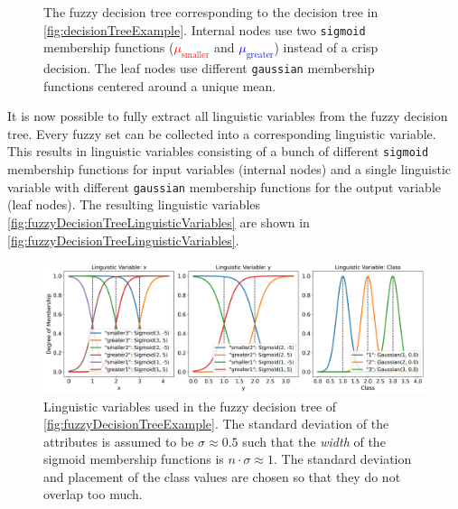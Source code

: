 \begin{figure}[H]

    \caption[Fuzzy decision tree created from the regular decision tree]{The fuzzy decision tree corresponding to the decision tree in \autoref{fig:decisionTreeExample}. Internal nodes use two \texttt{sigmoid} membership functions (\textcolor{red}{$\mu_{\text{smaller}}$} and \textcolor{blue}{$\mu_{\text{greater}}$}) instead of a crisp decision. The leaf nodes use different \texttt{gaussian} membership functions centered around a unique mean.}

    \label{fig:fuzzyDecisionTreeExample}
\end{figure}

It is now possible to fully extract all linguistic variables from the fuzzy decision tree. Every fuzzy set can be collected into a corresponding linguistic variable. This results in linguistic variables consisting of a bunch of different \texttt{sigmoid} membership functions for input variables (internal nodes) and a single linguistic variable with different \texttt{gaussian} membership functions for the output variable (leaf nodes). The resulting linguistic variables \autoref{fig:fuzzyDecisionTreeLinguisticVariables} are shown in \autoref{fig:fuzzyDecisionTreeLinguisticVariables}.


\begin{figure}[h]
    \centering

    \includegraphics[width=\linewidth]{figures/ProofOfConcepts/fuzzy_sets.png}

    \caption[Linguistic variables for the converted fuzzy decision tree]{Linguistic variables used in the fuzzy decision tree of \autoref{fig:fuzzyDecisionTreeExample}. The standard deviation of the attributes is assumed to be $\sigma \approx 0.5$ such that the \emph{width} of the sigmoid membership functions is $n\cdot \sigma \approx 1$. The standard deviation and placement of the class values are chosen so that they do not overlap too much.}
    \label{fig:fuzzyDecisionTreeLinguisticVariables}
\end{figure}

